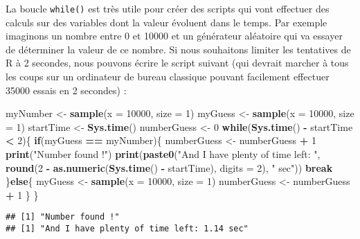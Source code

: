 \documentclass[]{book}
\newenvironment{Shaded}{\begin{snugshade}}{\end{snugshade}}
\newcommand{\KeywordTok}[1]{\textcolor[rgb]{0.13,0.29,0.53}{\textbf{#1}}}
\newcommand{\DataTypeTok}[1]{\textcolor[rgb]{0.13,0.29,0.53}{#1}}
\newcommand{\DecValTok}[1]{\textcolor[rgb]{0.00,0.00,0.81}{#1}}
\newcommand{\StringTok}[1]{\textcolor[rgb]{0.31,0.60,0.02}{#1}}
\newcommand{\ControlFlowTok}[1]{\textcolor[rgb]{0.13,0.29,0.53}{\textbf{#1}}}
\newcommand{\OperatorTok}[1]{\textcolor[rgb]{0.81,0.36,0.00}{\textbf{#1}}}
\newcommand{\NormalTok}[1]{#1}
\theoremstyle{definition}
\theoremstyle{definition}
\theoremstyle{definition}
\theoremstyle{remark}
\begin{document}
La boucle \texttt{while()} est très utile pour créer des scripts qui
vont effectuer des calculs sur des variables dont la valeur évoluent
dans le temps. Par exemple imaginons un nombre entre 0 et 10000 et un
générateur aléatoire qui va essayer de déterminer la valeur de ce
nombre. Si nous souhaitons limiter les tentatives de R à 2 secondes,
nous pouvons écrire le script suivant (qui devrait marcher à tous les
coups sur un ordinateur de bureau classique pouvant facilement effectuer
35000 essais en 2 secondes) :

\begin{Shaded}
\begin{Highlighting}[]
\NormalTok{myNumber <-}\StringTok{ }\KeywordTok{sample}\NormalTok{(}\DataTypeTok{x =} \DecValTok{10000}\NormalTok{, }\DataTypeTok{size =} \DecValTok{1}\NormalTok{)}
\NormalTok{myGuess <-}\StringTok{ }\KeywordTok{sample}\NormalTok{(}\DataTypeTok{x =} \DecValTok{10000}\NormalTok{, }\DataTypeTok{size =} \DecValTok{1}\NormalTok{)}
\NormalTok{startTime <-}\StringTok{ }\KeywordTok{Sys.time}\NormalTok{()}
\NormalTok{numberGuess <-}\StringTok{ }\DecValTok{0}
\ControlFlowTok{while}\NormalTok{(}\KeywordTok{Sys.time}\NormalTok{() }\OperatorTok{-}\StringTok{ }\NormalTok{startTime }\OperatorTok{<}\StringTok{ }\DecValTok{2}\NormalTok{)\{}
  \ControlFlowTok{if}\NormalTok{(myGuess }\OperatorTok{==}\StringTok{ }\NormalTok{myNumber)\{}
\NormalTok{    numberGuess <-}\StringTok{ }\NormalTok{numberGuess }\OperatorTok{+}\StringTok{ }\DecValTok{1}
    \KeywordTok{print}\NormalTok{(}\StringTok{"Number found !"}\NormalTok{)}
    \KeywordTok{print}\NormalTok{(}\KeywordTok{paste0}\NormalTok{(}\StringTok{"And I have plenty of time left: "}\NormalTok{, }
      \KeywordTok{round}\NormalTok{(}\DecValTok{2} \OperatorTok{-}\StringTok{ }\KeywordTok{as.numeric}\NormalTok{(}\KeywordTok{Sys.time}\NormalTok{() }\OperatorTok{-}\StringTok{ }\NormalTok{startTime), }\DataTypeTok{digits =} \DecValTok{2}\NormalTok{), }
      \StringTok{" sec"}\NormalTok{))}
    \ControlFlowTok{break}
\NormalTok{  \}}\ControlFlowTok{else}\NormalTok{\{}
\NormalTok{    myGuess <-}\StringTok{ }\KeywordTok{sample}\NormalTok{(}\DataTypeTok{x =} \DecValTok{10000}\NormalTok{, }\DataTypeTok{size =} \DecValTok{1}\NormalTok{)}
\NormalTok{    numberGuess <-}\StringTok{ }\NormalTok{numberGuess }\OperatorTok{+}\StringTok{ }\DecValTok{1}
\NormalTok{  \}}
\NormalTok{\}}
\end{Highlighting}
\end{Shaded}

\begin{verbatim}
## [1] "Number found !"
## [1] "And I have plenty of time left: 1.14 sec"
\end{verbatim}
\end{document}

